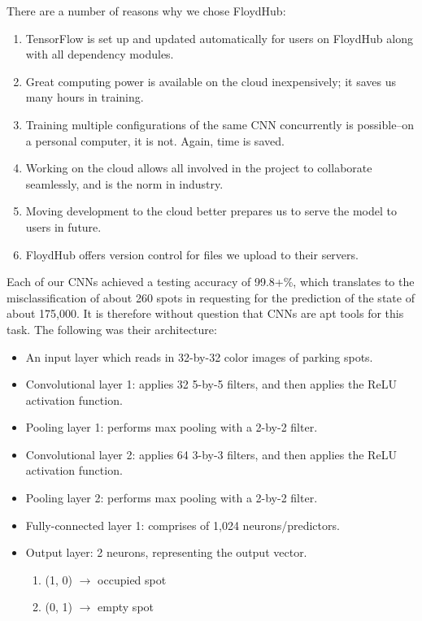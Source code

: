 \documentclass[a4paper, 11pt]{article} %
\begin{document}
    \newpage
    
    There are a number of reasons why we chose FloydHub: 
	\begin{enumerate}
		\item TensorFlow is set up and updated automatically for users on FloydHub along 
		with all dependency modules. 
		\item Great computing power is available on the cloud inexpensively; it saves us many hours 
		in training.
		\item Training multiple configurations of the same CNN concurrently is possible--on a personal 
		computer, it is not. Again, time is saved.
		\item Working on the cloud allows all involved in the project to collaborate seamlessly, and is the 
		norm in industry.
		\item Moving development to the cloud better prepares us to serve the model to users in future.
		\item FloydHub offers version control for files we upload to their servers.
	\end{enumerate}
	
	Each of our CNNs achieved a testing accuracy of 99.8+\%, which translates to the misclassification 
	of about 260 spots in requesting for the prediction of the state of about 175,000. It is therefore 
	without question that CNNs are apt tools for this task. The following was their architecture:
	\begin{itemize}
		\item[] An input layer which reads in 32-by-32 color images of parking spots.
		\item[] Convolutional layer 1: applies 32 5-by-5 filters, and then applies the ReLU activation 
		function.
		\item[] Pooling layer 1: performs max pooling with a 2-by-2 filter.
		\item[] Convolutional layer 2: applies 64 3-by-3 filters, and then applies the ReLU activation 
		function.
		\item[] Pooling layer 2: performs max pooling with a 2-by-2 filter.
		\item[] Fully-connected layer 1: comprises of 1,024 neurons/predictors.
		\item[] Output layer: 2 neurons, representing the output vector.
		\vspace*{-4mm}
		\begin{enumerate}
			\setlength\itemsep{-3mm}
			\item[] (1, 0) $\rightarrow$ occupied spot
			\item[] (0, 1) $\rightarrow$ empty spot
		\end{enumerate}
	\end{itemize}
\end{document}

